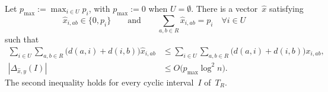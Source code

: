 \documentclass[12pt,a4paper,oneside]{report}
\begin{document}
\begin{lemma}\label{lem:circulation-endpoint-rounding}
Let $p_{\max}:=\max_{i\in U}p_i$, with $p_{\max}:=0$ when $U=\emptyset$.
There is a vector~$\widehat x$ satisfying
\[
    \widehat x_{i,ab}\in\{0,p_i\}
    \qquad\text{and}\qquad
    \sum_{a,b\in R}\widehat x_{i,ab}=p_i
    \quad\forall i\in U
\]
such that
\begin{align}
    \sum_{i\in U}\sum_{a,b\in R}
       \bigl(d(a,i)+d(i,b)\bigr)\widehat x_{i,ab}
    &\le
    \sum_{i\in U}\sum_{a,b\in R}
       \bigl(d(a,i)+d(i,b)\bigr)x_{i,ab},
    \label{eq:rounding-cost}\\
    |\Delta_{\widehat x,y}(I)|
    &\le O\bigl(p_{\max}\log^2 n\bigr).
    \label{eq:rounding-interval-balance}
\end{align}
The second inequality holds for every cyclic interval~$I$ of~$T_R$.
\end{lemma}
\end{document}
